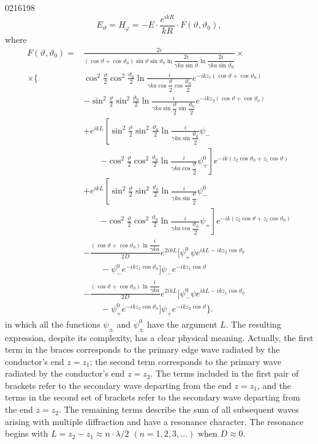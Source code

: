 \begin{scanpage}{0216}{198}
\[E_\vartheta=H_\varphi=-E\cdot\frac{e^{ikR}}{kR}\cdot F(\vartheta,\vartheta_0),\tag{32.04}\]
where
\[\begin{aligned}
F(\vartheta,\vartheta_0)={}&\frac{2i}{(\cos\vartheta+\cos\vartheta_0)\sin\vartheta\sin\vartheta_0\ln\dfrac{2i}{\gamma ka\sin\vartheta}\ln\dfrac{2i}{\gamma ka\sin\vartheta_0}}\times\\
\times\Biggl\{&\cos^2\frac\vartheta2\cos^2\frac{\vartheta_0}2\ln\frac{i}{\gamma ka\cos\dfrac\vartheta2\cos\dfrac{\vartheta_0}2}e^{-ikz_1(\cos\vartheta+\cos\vartheta_0)}\\
&-\sin^2\frac\vartheta2\sin^2\frac{\vartheta_0}2\ln\frac{i}{\gamma ka\sin\dfrac\vartheta2\sin\dfrac{\vartheta_0}2}e^{-ikz_2(\cos\vartheta+\cos\vartheta_0)}\\
&+e^{ikL}\left[\sin^2\frac\vartheta2\sin^2\frac{\vartheta_0}2\ln\frac{i}{\gamma ka\sin\dfrac{\vartheta_0}2}\psi_-\right.\\
&\qquad\left.-\cos^2\frac\vartheta2\cos^2\frac{\vartheta_0}2\ln\frac{i}{\gamma ka\cos\dfrac\vartheta2}\psi_+^0\right]e^{-ik(z_2\cos\vartheta_0+z_1\cos\vartheta)}\\
&+e^{ikL}\left[\sin^2\frac\vartheta2\sin^2\frac{\vartheta_0}2\ln\frac{i}{\gamma ka\sin\dfrac\vartheta2}\psi_-^0\right.\\
&\qquad\left.-\cos^2\frac\vartheta2\cos^2\frac{\vartheta_0}2\ln\frac{i}{\gamma ka\cos\dfrac{\vartheta_0}2}\psi_+\right]e^{-ik(z_2\cos\vartheta+z_1\cos\vartheta_0)}\\
&-\frac{(\cos\vartheta+\cos\vartheta_0)\ln\dfrac{i}{\gamma ka}}{2D}e^{2ikL}\bigl[\psi_+^0\psi e^{ikL-ikz_2\cos\vartheta_0}\\
&\qquad-\psi_-^0 e^{-ikz_1\cos\vartheta_0}\bigr]\psi_-e^{-ikz_1\cos\vartheta}\\
&-\frac{(\cos\vartheta+\cos\vartheta_0)\ln\dfrac{i}{\gamma ka}}{2D}e^{2ikL}\bigl[\psi_-^0\psi e^{ikL-ikz_1\cos\vartheta_0}\\
&\qquad-\psi_+^0 e^{-ikz_2\cos\vartheta_0}\bigr]\psi_+e^{-ikz_2\cos\vartheta}\Biggr\}.
\end{aligned}\tag{32.05}\]
in which all the functions $\psi_\pm$ and $\psi_\pm^0$ have the argument $L$. The resulting expression, despite its complexity, has a clear physical meaning. Actually, the first term in the braces corresponds to the primary edge wave radiated by the conductor's end $z=z_1$; the second term corresponds to the primary wave radiated by the conductor's end $z=z_2$. The terms included in the first pair of brackets refer to the secondary wave departing from the end $z=z_1$, and the terms in the second set of brackets refer to the secondary wave departing from the end $z=z_2$. The remaining terms describe the sum of all subsequent waves arising with multiple diffraction and have a resonance character. The resonance begins with $L=z_2-z_1\approx n\cdot\lambda/2$ $(n=1,2,3,\ldots)$ when $D\approx0$.
\end{scanpage}
